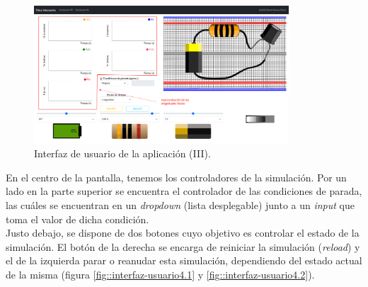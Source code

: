 \documentclass[../main.tex]{subfiles}
\begin{document}
\begin{figure}[!ht]
  \centering
  \includegraphics[width=0.85\textwidth]{images/resultados.png}
  \caption{Interfaz de usuario de la aplicación (III).}
  \label{fig::interfaz-usuario3}
\end{figure}

En el centro de la pantalla, tenemos los controladores de la simulación. Por un lado en la parte superior se encuentra el controlador de las condiciones de parada, las cuáles se encuentran en un \textit{dropdown} (lista desplegable) junto a un \textit{input} que toma el valor de dicha condición.\\

Justo debajo, se dispone de dos botones cuyo objetivo es controlar el estado de la simulación. El botón de la derecha se encarga de reiniciar la simulación (\textit{reload}) y el de la izquierda parar o reanudar esta simulación, dependiendo del estado actual de la misma (figura \ref{fig::interfaz-usuario4.1} y \ref{fig::interfaz-usuario4.2}). \\
\end{document}
